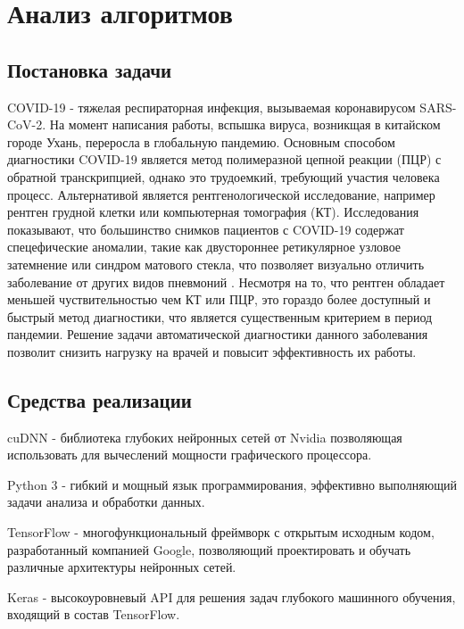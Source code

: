\section{Анализ алгоритмов} \label{Dev}

\subsection{Постановка задачи}
COVID-19 - тяжелая респираторная инфекция, вызываемая коронавирусом SARS-CoV-2. На момент написания работы, вспышка вируса, возникщая в китайском городе Ухань, переросла в глобальную пандемию. Основным способом диагностики COVID-19 является метод полимеразной цепной реакции (ПЦР) с обратной транскрипцией, однако это трудоемкий, требующий участия человека процесс. Альтернативой является рентгенологической исследование, например рентген грудной клетки или компьютерная томография (КТ). Исследования показывают, что большинство снимков пациентов с COVID-19 содержат спецефические аномалии, такие как двустороннее ретикулярное узловое затемнение или синдром матового стекла, что позволяет визуально отличить заболевание от других видов пневмоний \cite{wang2020covidnet}. Несмотря на то, что рентген обладает меньшей чуствительностью чем КТ или ПЦР, это гораздо более доступный и быстрый метод диагностики, что является существенным критерием в период пандемии. Решение задачи автоматической диагностики данного заболевания позволит снизить нагрузку на врачей и повысит эффективность их работы.


\subsection{Средства реализации}
cuDNN - библиотека глубоких нейронных сетей от Nvidia позволяющая использовать для вычеслений мощности графического процессора.

Python 3 - гибкий и мощный язык программирования, эффективно выполняющий задачи анализа и обработки данных.

TensorFlow - многофункциональный фреймворк с открытым исходным кодом, разработанный компанией Google, позволяющий проектировать и обучать различные архитектуры нейронных сетей.

Keras - высокоуровневый API для решения задач глубокого машинного обучения, входящий в состав TensorFlow.


